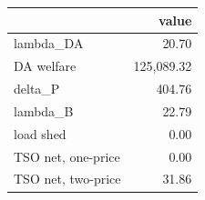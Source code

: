 \begin{tabular}{lr}
\toprule
 & value \\
\midrule
lambda\_DA & 20.70 \\
DA welfare & 125,089.32 \\
delta\_P & 404.76 \\
lambda\_B & 22.79 \\
load shed & 0.00 \\
TSO net, one-price & 0.00 \\
TSO net, two-price & 31.86 \\
\bottomrule
\end{tabular}
